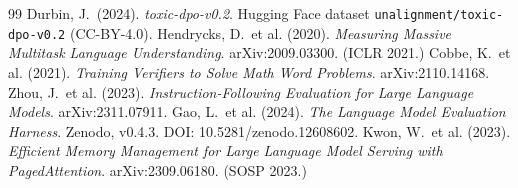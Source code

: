 \documentclass[11pt,a4paper]{article}
\begin{document}
\begin{thebibliography}{99}
 Durbin, J.\ (2024). \emph{toxic-dpo-v0.2}. Hugging Face dataset \texttt{unalignment/toxic-dpo-v0.2} (CC-BY-4.0).
 Hendrycks, D.\ et al. (2020). \emph{Measuring Massive Multitask Language Understanding}. arXiv:2009.03300. (ICLR 2021.)
 Cobbe, K.\ et al. (2021). \emph{Training Verifiers to Solve Math Word Problems}. arXiv:2110.14168.
 Zhou, J.\ et al. (2023). \emph{Instruction-Following Evaluation for Large Language Models}. arXiv:2311.07911.
 Gao, L.\ et al. (2024). \emph{The Language Model Evaluation Harness}. Zenodo, v0.4.3. DOI: 10.5281/zenodo.12608602.
 Kwon, W.\ et al. (2023). \emph{Efficient Memory Management for Large Language Model Serving with PagedAttention}. arXiv:2309.06180. (SOSP 2023.)
\end{thebibliography}
\end{document}
